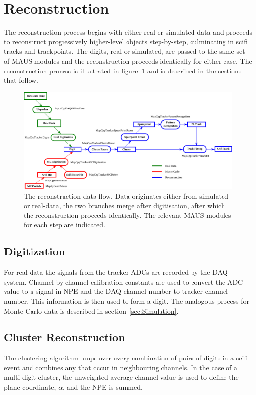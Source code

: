\section{Reconstruction}
\label{sec:Reconstruction}
The reconstruction process begins with either real or simulated data and proceeds to reconstruct progressively higher-level objects step-by-step, culminating in scifi tracks and trackpoints. The digits, real or simulated, are passed to the same set of MAUS modules and the reconstruction proceeds identically for either case. The reconstruction process is illustrated in figure~\ref{fig:DataFlow} and is described in the sections that follow.

\begin{figure}[tb]
  \begin{center}
    \includegraphics[width=0.95\linewidth]{07-Reconstruction/DataFlow2016.pdf}
    \caption{\label{fig:DataFlow} The reconstruction data flow. Data originates either from simulated or real-data, the two branches merge after digitisation, after which the reconstruction proceeds identically.  The relevant MAUS modules for each step are indicated.}
  \end{center}
\end{figure}

  \subsection{Digitization}
  \label{subsec:Digitization}
  For real data the signals from the tracker ADCs are recorded by the DAQ system.  Channel-by-channel calibration constants are used to convert the ADC value to a signal in NPE and the DAQ channel number to tracker channel number.  This information is then used to form a digit.  The analogous process for Monte Carlo data is described in section~\ref{sec:Simulation}.

  \subsection{Cluster Reconstruction}
  \label{subsec:Clustering}
  The clustering algorithm loops over every combination of pairs of digits in a scifi event and combines any that occur in neighbouring channels. In the case of a multi-digit cluster, the unweighted average channel value is used to define the plane coordinate, $\alpha$, and the NPE is summed.

